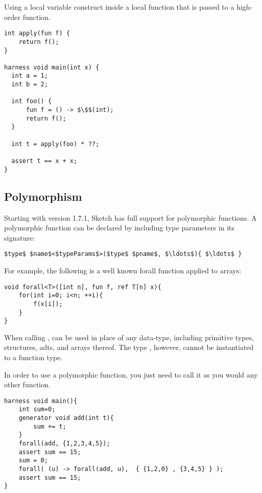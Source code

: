 \begin{Example}
Using a local variable construct inside a local function that is passed to a high-order function.
\begin{lstlisting}
int apply(fun f) {
    return f();
}

harness void main(int x) {
  int a = 1;
  int b = 2;
  
  int foo() {
      fun f = () -> $\$$(int);
      return f();
  }
  
  int t = apply(foo) * ??;
  
  assert t == x + x;
}
\end{lstlisting}

\end{Example}

\subsection{Polymorphism}

Starting with version 1.7.1, Sketch has full support for polymorphic functions. A polymorphic function can be declared by including type parameters in its signature:
\begin{lstlisting}
$type$ $name$<$typeParams$>($type$ $pname$, $\ldots$){ $\ldots$ }
\end{lstlisting}

For example, the following is a well known forall function applied to arrays:

\begin{lstlisting}
void forall<T>([int n], fun f, ref T[n] x){
    for(int i=0; i<n; ++i){
        f(x[i]);
    }
}
\end{lstlisting}

When calling ,  can be used in place of any data-type, including primitive types, structures, adts, and arrays thereof. The type , however, cannot be instantiated to a function type.

In order to use a polymorphic function, you just need to call it as you would any other function. 

\begin{Example}
\begin{lstlisting}
harness void main(){
    int sum=0;
    generator void add(int t){
        sum += t;
    }
    forall(add, {1,2,3,4,5});
    assert sum == 15;
    sum = 0;
    forall( (u) -> forall(add, u),  { {1,2,0} , {3,4,5} } );
    assert sum == 15;
}
\end{lstlisting}
\end{Example}



